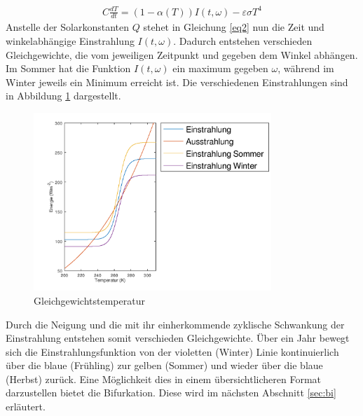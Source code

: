 \begin{refsection}
\begin{eqnarray} \label{eq2}
C \frac{d T}{d t} = (1-\alpha(T)) I(t, \omega) - \varepsilon \sigma T^4
\end{eqnarray}
Anstelle der Solarkonstanten $Q$ stehet in Gleichung \eqref{eq2} nun die Zeit und winkelabhängige Einstrahlung $I(t,\omega)$. Dadurch entstehen verschieden Gleichgewichte, die vom jeweiligen Zeitpunkt und gegeben dem Winkel abhängen. Im Sommer hat die Funktion $I(t,\omega)$ ein maximum gegeben $\omega$, während im Winter jeweils ein Minimum erreicht ist. Die verschiedenen Einstrahlungen sind in Abbildung \ref{fig:abb7} dargestellt. 
%
\begin{figure}
	\centering
	\includegraphics[width= 0.8\textwidth]{neigung/Strahlung_2.png}
	\caption[Gleichgewichtstemperatur]{Gleichgewichtstemperatur}
	\label{fig:abb7}
\end{figure}
Durch die Neigung und die mit ihr einherkommende zyklische Schwankung der Einstrahlung entstehen somit verschieden Gleichgewichte. Über ein Jahr bewegt sich die Einstrahlungsfunktion von der violetten (Winter) Linie kontinuierlich über die blaue (Frühling) zur gelben (Sommer) und wieder über die blaue (Herbst) zurück. Eine Möglichkeit dies in einem übersichtlicheren Format darzustellen bietet die Bifurkation. Diese wird im nächsten Abschnitt \ref{sec:bi} erläutert. 



\end{refsection}
